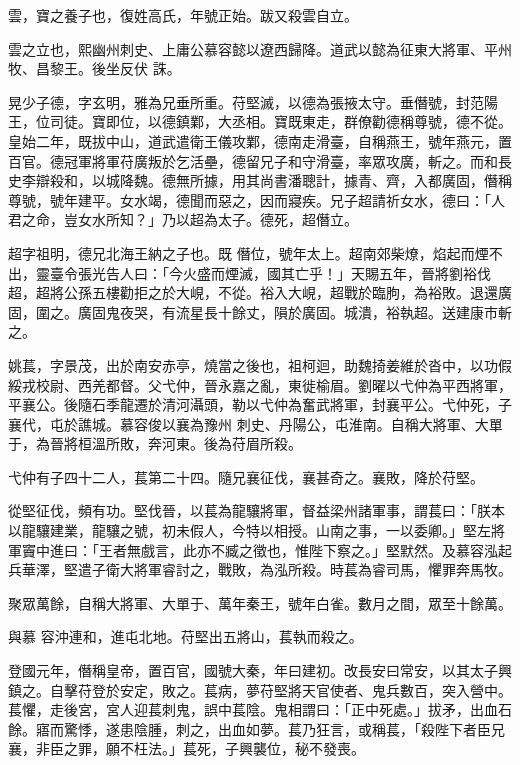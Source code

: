 \begin{pinyinscope}
 雲，寶之養子也，復姓高氏，年號正始。跋又殺雲自立。



 雲之立也，熙幽州刺史、上庸公慕容懿以遼西歸降。道武以懿為征東大將軍、平州牧、昌黎王。後坐反伏
 誅。



 晃少子德，字玄明，雅為兄垂所重。苻堅滅，以德為張掖太守。垂僭號，封范陽王，位司徒。寶即位，以德鎮鄴，大丞相。寶既東走，群僚勸德稱尊號，德不從。皇始二年，既拔中山，道武遣衛王儀攻鄴，德南走滑臺，自稱燕王，號年燕元，置百官。德冠軍將軍苻廣叛於乞活壘，德留兄子和守滑臺，率眾攻廣，斬之。而和長史李辯殺和，以城降魏。德無所據，用其尚書潘聰計，據青、齊，入都廣固，僭稱尊號，號年建平。女水竭，德聞而惡之，因而寢疾。兄子超請祈女水，德曰：「人君之命，豈女水所知？」乃以超為太子。德死，超僭立。



 超字祖明，德兄北海王納之子也。既
 僭位，號年太上。超南郊柴燎，焰起而煙不出，靈臺令張光告人曰：「今火盛而煙滅，國其亡乎！」天賜五年，晉將劉裕伐超，超將公孫五樓勸拒之於大峴，不從。裕入大峴，超戰於臨朐，為裕敗。退還廣固，圍之。廣固鬼夜哭，有流星長十餘丈，隕於廣固。城潰，裕執超。送建康市斬之。



 姚萇，字景茂，出於南安赤亭，燒當之後也，祖柯迴，助魏掎姜維於沓中，以功假綏戎校尉、西羌都督。父弋仲，晉永嘉之亂，東徙榆眉。劉曜以弋仲為平西將軍，平襄公。後隨石季龍遷於清河灄頭，勒以弋仲為奮武將軍，封襄平公。弋仲死，子襄代，屯於譙城。慕容俊以襄為豫州
 刺史、丹陽公，屯淮南。自稱大將軍、大單于，為晉將桓溫所敗，奔河東。後為苻眉所殺。



 弋仲有子四十二人，萇第二十四。隨兄襄征伐，襄甚奇之。襄敗，降於苻堅。



 從堅征伐，頻有功。堅伐晉，以萇為龍驤將軍，督益梁州諸軍事，謂萇曰：「朕本以龍驤建業，龍驤之號，初未假人，今特以相授。山南之事，一以委卿。」堅左將軍竇中進曰：「王者無戲言，此亦不臧之徵也，惟陛下察之。」堅默然。及慕容泓起兵華澤，堅遣子衛大將軍睿討之，戰敗，為泓所殺。時萇為睿司馬，懼罪奔馬牧。



 聚眾萬餘，自稱大將軍、大單于、萬年秦王，號年白雀。數月之間，眾至十餘萬。



 與慕
 容沖連和，進屯北地。苻堅出五將山，萇執而殺之。



 登國元年，僭稱皇帝，置百官，國號大秦，年曰建初。改長安曰常安，以其太子興鎮之。自擊苻登於安定，敗之。萇病，夢苻堅將天官使者、鬼兵數百，突入營中。萇懼，走後宮，宮人迎萇刺鬼，誤中萇陰。鬼相謂曰：「正中死處。」拔矛，出血石餘。寤而驚悸，遂患陰腫，刺之，出血如夢。萇乃狂言，或稱萇，「殺陛下者臣兄襄，非臣之罪，願不枉法。」萇死，子興襲位，秘不發喪。




\end{pinyinscope}
